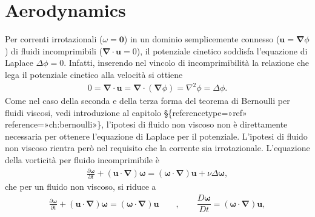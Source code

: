 \documentclass[letterpaper,10pt,italian]{jupyterBook}
\begin{document}
\chapter{Aerodynamics}
\label{\detokenize{polimi/fluidmechanics-ita/template/capitoli/08_aerodinamica/08teoria:aerodynamics}}\label{\detokenize{polimi/fluidmechanics-ita/template/capitoli/08_aerodinamica/08teoria:fluid-mechanics-aerodynamics}}\label{\detokenize{polimi/fluidmechanics-ita/template/capitoli/08_aerodinamica/08teoria::doc}}
\sphinxAtStartPar
Per correnti irrotazionali (\(\omega = \mathbf{0}\)) in un dominio
semplicemente connesso (\(\mathbf{u} = \mathbf{\nabla} \phi\)) di fluidi
incomprimibili (\(\mathbf{\nabla} \cdot \mathbf{u} = 0\)), il potenziale cinetico
soddisfa l’equazione di Laplace \(\Delta \phi = 0\). Infatti, inserendo
nel vincolo di incomprimibilità la relazione che lega il potenziale
cinetico alla velocità si ottiene
\begin{equation*}
\begin{split}0 = \mathbf{\nabla} \cdot \mathbf{u} = \mathbf{\nabla} \cdot (\mathbf{\nabla} \phi) = \nabla^2 \phi = \Delta \phi .\end{split}
\end{equation*}
\sphinxAtStartPar
Come nel caso della seconda e della terza forma del teorema di Bernoulli
per fluidi viscosi, vedi introduzione al capitolo
§\{reference\sphinxhyphen{}type=»ref»
reference=»ch:bernoulli»\}, l’ipotesi di fluido non viscoso non è
direttamente necessaria per ottenere l’equazione di Laplace per il
potenziale. L’ipotesi di fluido non viscoso rientra però nel requisito
che la corrente sia irrotazionale. L’equazione della vorticità per
fluido incomprimibile è
\begin{equation*}
\begin{split}\frac{\partial \mathbf{\omega}}{\partial t} + (\mathbf{u} \cdot \mathbf{\nabla}) \mathbf{\omega} = (\mathbf{\omega} \cdot \mathbf{\nabla}) \mathbf{u} + \nu \Delta \mathbf{\omega} ,\end{split}
\end{equation*}
\sphinxAtStartPar
che per un fluido non viscoso, si riduce a
\begin{equation*}
\begin{split}\frac{\partial \mathbf{\omega}}{\partial t} + (\mathbf{u} \cdot \mathbf{\nabla}) \mathbf{\omega} = (\mathbf{\omega} \cdot \mathbf{\nabla}) \mathbf{u}  \qquad , \qquad
 \dfrac{D \mathbf{\omega}}{D t} = (\mathbf{\omega} \cdot \mathbf{\nabla}) \mathbf{u} ,\end{split}
\end{equation*}
\end{document}
